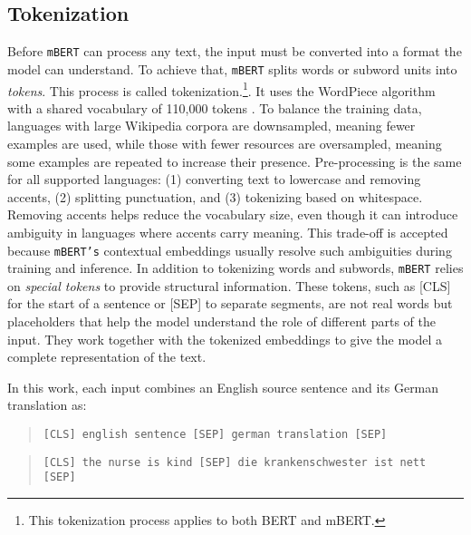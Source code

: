 \subsection{Tokenization}
Before \texttt{mBERT} can process any text, the input must be converted into a format the model can understand. To achieve that, \texttt{mBERT} splits words or subword units into \textit{tokens}. This process is called tokenization.\footnote{This tokenization process applies to both BERT and mBERT.}. It uses the WordPiece algorithm with a shared vocabulary of 110,000 tokens \parencite{devlinMultilingualBERTGitHub2018}. To balance the training data, languages with large Wikipedia corpora are downsampled, meaning fewer examples are used, while those with fewer resources are oversampled, meaning some examples are repeated to increase their presence. Pre-processing is the same for all supported languages: (1) converting text to lowercase and removing accents, (2) splitting punctuation, and (3) tokenizing based on whitespace. Removing accents helps reduce the vocabulary size, even though it can introduce ambiguity in languages where accents carry meaning. This trade-off is accepted because \texttt{mBERT's} contextual embeddings usually resolve such ambiguities during training and inference. In addition to tokenizing words and subwords, \texttt{mBERT} relies on \textit{special tokens} to provide structural information. These tokens, such as [CLS] for the start of a sentence or [SEP] to separate segments, are not real words but placeholders that help the model understand the role of different parts of the input. They work together with the tokenized embeddings to give the model a complete representation of the text.

\noindent In this work, each input combines an English source sentence and its German translation as:

\begin{quote}
    \texttt{[CLS] english sentence [SEP] german translation [SEP]}
\end{quote}

\begin{quote}
\texttt{[CLS] the nurse is kind [SEP] die krankenschwester ist nett [SEP]}
\end{quote}


